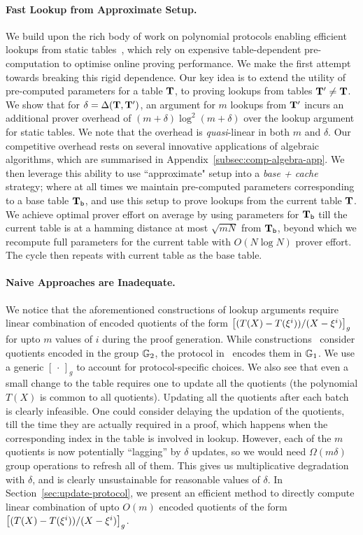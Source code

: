 \paragraph{\bf Fast Lookup from Approximate Setup.} We build upon the rich body of work on polynomial protocols enabling efficient lookups from static tables~\cite{CCS:ZBKMNS22,EPRINT:PosKat22,EPRINT:ZGKMR22,EPRINT:EagFioGab22}, which rely on expensive table-dependent pre-computation
to optimise online proving performance. We make the first attempt towards breaking this rigid dependence.
Our key idea is to extend the utility of pre-computed
parameters for a table $\mathbf{T}$, to proving lookups from tables $\mathbf{T}'\neq \mathbf{T}$.
We show that for $\delta=\Delta(\mathbf{T}, \mathbf{T}')$,
an argument for $m$ lookups from $\mathbf{T}'$ incurs an additional prover overhead of $(m+\delta)\log^2(m+\delta)$ over the
lookup argument for static tables. We note that the overhead is {\em quasi}-linear in both $m$ and $\delta$.
Our competitive overhead rests on several innovative applications of algebraic
algorithms, which are summarised in Appendix~\ref{subsec:comp-algebra-app}. We then leverage this ability to use ``approximate"
setup into a {\em base + cache} strategy; where at all times we maintain pre-computed parameters corresponding to
a base table $\mathbf{T}_{\mathsf{b}}$, and use this setup to prove lookups from the current table $\mathbf{T}$. We achieve optimal
prover effort on average by using parameters for $\mathbf{T}_{\mathsf{b}}$ till the current table is at a hamming distance
at most $\sqrt{mN}$ from $\mathbf{T}_{\mathsf{b}}$, beyond which we recompute full parameters for the current table with
$O(N\log N)$ prover effort. The cycle then repeats with current table as the base table.

\paragraph{\bf Naive Approaches are Inadequate.} We notice that the aforementioned constructions of lookup arguments require linear combination of
encoded quotients of the form $\left[{(T(X)-T(\xi^i))/(X-\xi^i)}\right]_g$ for upto $m$ values of $i$ during the proof generation.
While constructions~\cite{CCS:ZBKMNS22,EPRINT:PosKat22}
consider quotients encoded in the group $\mathbb{G}_2$, the protocol in~\cite{EPRINT:EagFioGab22} encodes them in $\mathbb{G}_1$.
We use a generic $[\,\cdot\,]_g$ to
account for protocol-specific choices. We also see that even a small change to the table requires one to update all the quotients (the polynomial $T(X)$ is
common to all quotients). Updating all the quotients after each batch is clearly infeasible. One could consider delaying the updation of the quotients, till
the time they are actually required in a proof, which happens when the corresponding index in the table is involved in lookup. However, each of the $m$ quotients
is now potentially ``lagging'' by $\delta$ updates, so we would need $\Omega(m\delta)$ group operations to refresh all of them. This gives us multiplicative degradation
with $\delta$, and is clearly unsustainable for reasonable values of $\delta$. In Section~\ref{sec:update-protocol}, we present an efficient method
to directly compute linear combination of upto $O(m)$ encoded quotients of the form $\left[{(T(X)-T(\xi^i))/(X-\xi^i)}\right]_g$.

